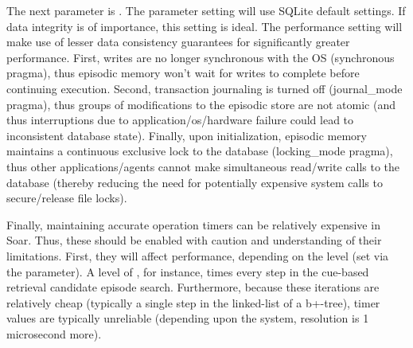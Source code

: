 The next parameter is .  The  parameter setting will use SQLite default settings.  If data integrity is of importance, this setting is ideal.  The performance setting will make use of lesser data consistency guarantees for significantly greater performance.  First, writes are no longer synchronous with the OS (synchronous pragma), thus episodic memory won't wait for writes to complete before continuing execution.  Second, transaction journaling is turned off (journal\_mode pragma), thus groups of modifications to the episodic store are not atomic (and thus interruptions due to application/os/hardware failure could lead to inconsistent database state).  Finally, upon initialization, episodic memory maintains a continuous exclusive lock to the database (locking\_mode pragma), thus other applications/agents cannot make simultaneous read/write calls to the database (thereby reducing the need for potentially expensive system calls to secure/release file locks).

Finally, maintaining accurate operation timers can be relatively expensive in Soar.  Thus, these should be enabled with caution and understanding of their limitations.  First, they will affect performance, depending on the level (set via the  parameter).  A level of , for instance, times every step in the cue-based retrieval candidate episode search.  Furthermore, because these iterations are relatively cheap (typically a single step in the linked-list of a b+-tree), timer values are typically unreliable (depending upon the system, resolution is 1 microsecond more).
